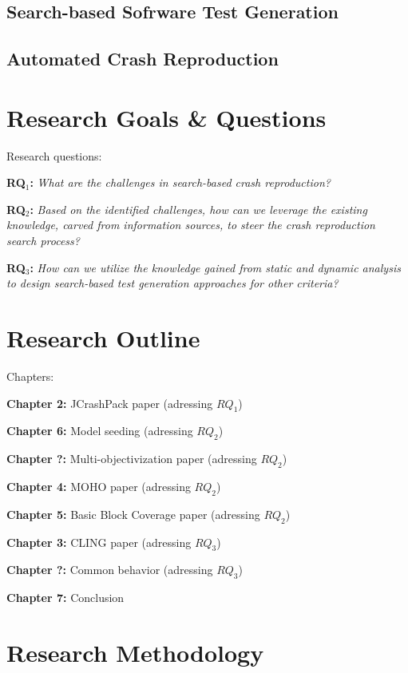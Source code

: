 \subsection{Search-based Sofrware Test Generation}

\subsection{Automated Crash Reproduction}

\section{Research Goals \& Questions}
Research questions:


\textbf{RQ$_1$: } \textit{What are the challenges in search-based crash reproduction?}

\textbf{RQ$_2$: } \textit{Based on the identified challenges, how can we leverage the existing knowledge, carved from information sources, to steer the crash reproduction search process?}

\textbf{RQ$_3$: } \textit{How can we utilize the knowledge gained from static and dynamic analysis to design search-based test generation approaches for other criteria?}


\section{Research Outline}

Chapters:

\textbf{Chapter 2: } JCrashPack paper (adressing $RQ_1$)


\textbf{Chapter 6: } Model seeding (adressing $RQ_2$)

\textbf{Chapter ?: } Multi-objectivization paper (adressing $RQ_2$)

\textbf{Chapter 4: } MOHO paper (adressing $RQ_2$)

\textbf{Chapter 5: } Basic Block Coverage paper (adressing $RQ_2$)

\textbf{Chapter 3: } CLING paper (adressing $RQ_3$)

\textbf{Chapter ?: } Common behavior (adressing $RQ_3$)

\textbf{Chapter 7: } Conclusion


\section{Research Methodology}

